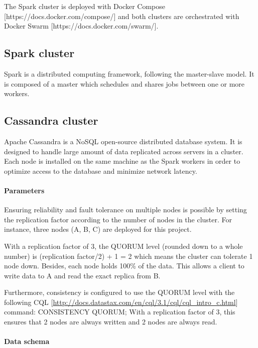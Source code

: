 \documentclass[11pt]{article}
\begin{document}
The Spark cluster is deployed with Docker Compose [https://docs.docker.com/compose/] and both clusters are orchestrated with Docker Swarm [https://docs.docker.com/swarm/].

\subsection{Spark cluster}


Spark is a distributed computing framework, following the master-slave model. It is composed of a master which schedules and shares jobs between one or more workers.

\subsection{Cassandra cluster}

Apache Cassandra is a NoSQL open-source distributed database system. It is designed to handle large amount of data replicated across servers in a cluster. Each node is installed on the same machine as the Spark workers in order to optimize access to the database and minimize network latency.

\paragraph{Parameters}

Ensuring reliability and fault tolerance on multiple nodes is possible by setting the replication factor according to the number of nodes in the cluster. For instance, three nodes (A, B, C) are deployed for this project. 

With a replication factor of 3, the QUORUM level (rounded down to a whole number) is (replication factor/2) + 1 = 2 which means the cluster can tolerate 1 node down. Besides, each node holds 100\% of the data. This allows a client to write data to A and read the exact replica from B.

Furthermore, consistency is configured to use the QUORUM level with the following CQL [\url{http://docs.datastax.com/en/cql/3.1/cql/cql_intro_c.html}] command: CONSISTENCY QUORUM;
With a replication factor of 3, this ensures that 2 nodes are always written and 2 nodes are always read.

\paragraph{Data schema}
\end{document}
